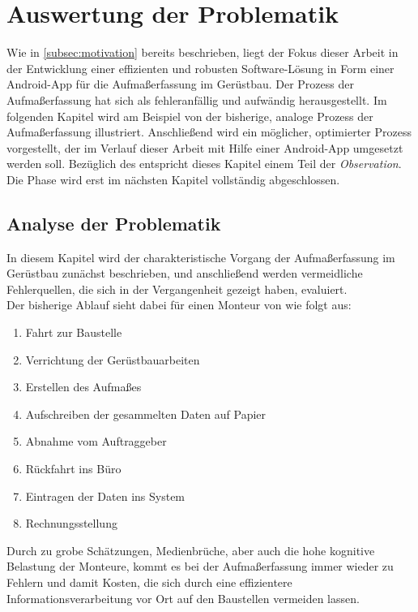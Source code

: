 \chapter{Auswertung der Problematik}\label{chap:problem}
Wie in \autoref{subsec:motivation} bereits beschrieben, liegt der Fokus dieser Arbeit in der Entwicklung einer effizienten und robusten Software-Lösung in Form einer Android-App für die Aufmaßerfassung im Gerüstbau.
Der Prozess der Aufmaßerfassung hat sich als fehleranfällig und aufwändig herausgestellt.
Im folgenden Kapitel wird am Beispiel von \vr{} der bisherige, analoge Prozess der Aufmaßerfassung illustriert.
Anschließend wird ein möglicher, optimierter Prozess vorgestellt, der im Verlauf dieser Arbeit mit Hilfe einer Android-App umgesetzt werden soll.
Bezüglich des \hcdp{} entspricht dieses Kapitel einem Teil der \emph{Observation}.
Die Phase wird erst im nächsten Kapitel vollständig abgeschlossen.

\section{Analyse der Problematik}\label{sec:problem}
In diesem Kapitel wird der charakteristische Vorgang der Aufmaßerfassung im Gerüstbau zunächst beschrieben, und anschließend werden vermeidliche Fehlerquellen, die sich in der Vergangenheit gezeigt haben, evaluiert. \\

\noindent
Der bisherige Ablauf sieht dabei für einen Monteur von \vr{} wie folgt aus:
\begin{enumerate}
  \item Fahrt zur Baustelle
  \item Verrichtung der Gerüstbauarbeiten
  \item Erstellen des Aufmaßes
  \item Aufschreiben der gesammelten Daten auf Papier \label{itm:paper}
  \item Abnahme vom Auftraggeber
  \item Rückfahrt ins Büro
  \item Eintragen der Daten ins System \label{itm:system}
  \item Rechnungsstellung
\end{enumerate}

\noindent
Durch zu grobe Schätzungen, Medienbrüche, aber auch die hohe kognitive Belastung der Monteure, kommt es bei der Aufmaßerfassung immer wieder zu Fehlern und damit Kosten, die sich durch eine effizientere Informationsverarbeitung vor Ort auf den Baustellen vermeiden lassen. \\

